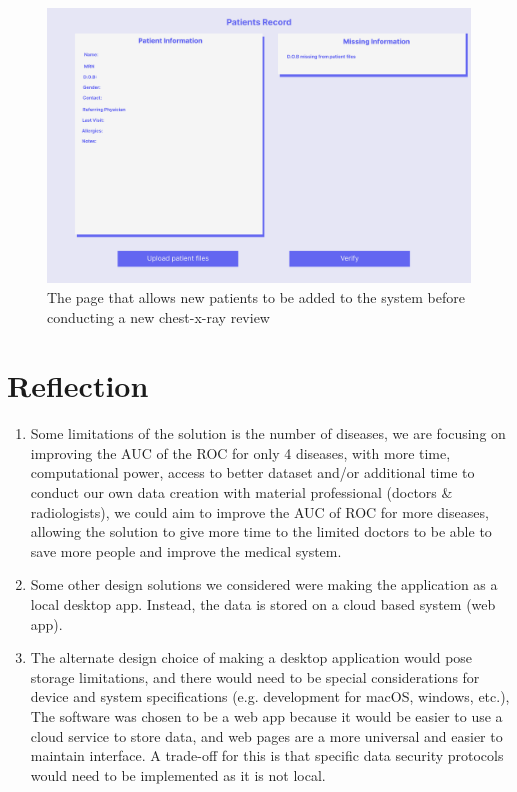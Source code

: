 \documentclass[12pt, titlepage]{article}
\begin{document}
\begin{figure}[H]
    \centering
    \includegraphics[scale=0.30]{chest-x-ray-ai (5).png}
    \caption{The page that allows new patients to be added to the system before conducting a new chest-x-ray review}
    \label{fig:NewPaitentRecordPage}
\end{figure}


\section{Reflection}
\begin{enumerate}
    \item Some limitations of the solution is the number of diseases, we are focusing on improving the AUC of the ROC for only 4 diseases, with more time, computational power, access to better dataset and/or additional time to conduct our own data creation with material professional (doctors \& radiologists), we could aim to improve the AUC of ROC for more diseases, allowing the solution to give more time to the limited doctors to be able to save more people and improve the medical system.
    \item Some other design solutions we considered were making the application as a local desktop app. Instead, the data is stored on a cloud based system (web app).
    \item The alternate design choice of making a desktop application would pose storage limitations, and there would need to be special considerations for device and system specifications (e.g. development for macOS, windows, etc.), The software was chosen to be a web app because it would be easier to use a cloud service to store data, and web pages are a more universal and easier to maintain interface. A trade-off for this is that specific data security protocols would need to be implemented as it is not local.
\end{enumerate}
\end{document}
